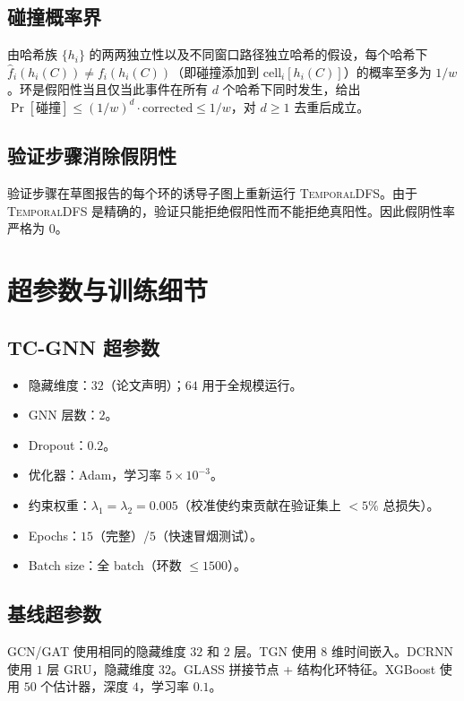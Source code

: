 \documentclass[journal,onecolumn]{IEEEtran}
\begin{document}
\subsection{碰撞概率界}

由哈希族 $\{h_i\}$ 的两两独立性以及不同窗口路径独立哈希的假设，每个哈希下 $\hat{f}_i(h_i(C)) \neq f_i(h_i(C))$（即碰撞添加到 $\mathrm{cell}_i[h_i(C)]$）的概率至多为 $1/w$。环是假阳性当且仅当此事件在所有 $d$ 个哈希下同时发生，给出 $\Pr[\mathrm{碰撞}] \leq (1/w)^d \cdot \mathrm{corrected} \leq 1/w$，对 $d \geq 1$ 去重后成立。

\subsection{验证步骤消除假阴性}

验证步骤在草图报告的每个环的诱导子图上重新运行 \textsc{TemporalDFS}。由于 \textsc{TemporalDFS} 是精确的，验证只能拒绝假阳性而不能拒绝真阳性。因此假阴性率严格为 $0$。

\section{超参数与训练细节}
\label{sec:appx-hp}

\subsection{TC-GNN 超参数}

\begin{itemize}
\item 隐藏维度：$32$（论文声明）；$64$ 用于全规模运行。
\item GNN 层数：$2$。
\item Dropout：$0.2$。
\item 优化器：Adam，学习率 $5 \times 10^{-3}$。
\item 约束权重：$\lambda_1 = \lambda_2 = 0.005$（校准使约束贡献在验证集上 $< 5\%$ 总损失）。
\item Epochs：$15$（完整）/$5$（快速冒烟测试）。
\item Batch size：全 batch（环数 $\le 1500$）。
\end{itemize}

\subsection{基线超参数}

GCN/GAT 使用相同的隐藏维度 $32$ 和 $2$ 层。TGN 使用 $8$ 维时间嵌入。DCRNN 使用 $1$ 层 GRU，隐藏维度 $32$。GLASS 拼接节点 + 结构化环特征。XGBoost 使用 $50$ 个估计器，深度 $4$，学习率 $0.1$。
\end{document}
